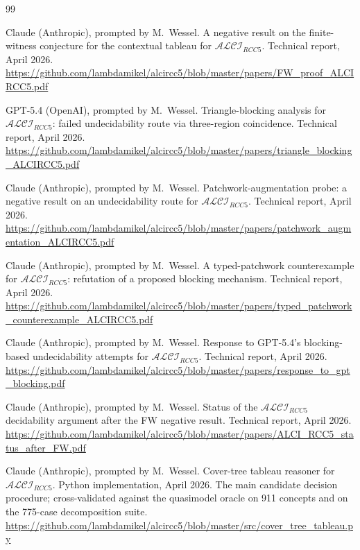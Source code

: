 \documentclass[
]{ceurart}
\theoremstyle{definition}
\newcommand{\ALCIRCC}[1]{\ensuremath{\mathcal{ALCI}_{\mathit{RCC#1}}}}
\begin{document}
\begin{thebibliography}{99}

Claude (Anthropic), prompted by M.\ Wessel.
\newblock A negative result on the finite-witness conjecture for
  the contextual tableau for $\ALCIRCC{5}$.
\newblock Technical report, April 2026.
\newblock \url{https://github.com/lambdamikel/alcircc5/blob/master/papers/FW_proof_ALCIRCC5.pdf}

GPT-5.4 (OpenAI), prompted by M.\ Wessel.
\newblock Triangle-blocking analysis for $\ALCIRCC{5}$: failed
  undecidability route via three-region coincidence.
\newblock Technical report, April 2026.
\newblock \url{https://github.com/lambdamikel/alcircc5/blob/master/papers/triangle_blocking_ALCIRCC5.pdf}

Claude (Anthropic), prompted by M.\ Wessel.
\newblock Patchwork-augmentation probe: a negative result on an
  undecidability route for $\ALCIRCC{5}$.
\newblock Technical report, April 2026.
\newblock \url{https://github.com/lambdamikel/alcircc5/blob/master/papers/patchwork_augmentation_ALCIRCC5.pdf}

Claude (Anthropic), prompted by M.\ Wessel.
\newblock A typed-patchwork counterexample for $\ALCIRCC{5}$:
  refutation of a proposed blocking mechanism.
\newblock Technical report, April 2026.
\newblock \url{https://github.com/lambdamikel/alcircc5/blob/master/papers/typed_patchwork_counterexample_ALCIRCC5.pdf}

Claude (Anthropic), prompted by M.\ Wessel.
\newblock Response to GPT-5.4's blocking-based undecidability
  attempts for $\ALCIRCC{5}$.
\newblock Technical report, April 2026.
\newblock \url{https://github.com/lambdamikel/alcircc5/blob/master/papers/response_to_gpt_blocking.pdf}

Claude (Anthropic), prompted by M.\ Wessel.
\newblock Status of the $\ALCIRCC{5}$ decidability argument after
  the FW negative result.
\newblock Technical report, April 2026.
\newblock \url{https://github.com/lambdamikel/alcircc5/blob/master/papers/ALCI_RCC5_status_after_FW.pdf}


Claude (Anthropic), prompted by M.\ Wessel.
\newblock Cover-tree tableau reasoner for $\ALCIRCC{5}$.
\newblock Python implementation, April 2026.
\newblock The main candidate decision procedure; cross-validated
  against the quasimodel oracle on 911 concepts and on the 775-case
  decomposition suite.
\newblock \url{https://github.com/lambdamikel/alcircc5/blob/master/src/cover_tree_tableau.py}


\end{thebibliography}
\end{document}
